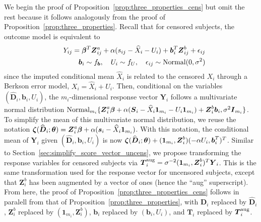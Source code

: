 \documentclass[12pt]{article}
\def\Normal{\hbox{Normal}}
\def\bse{\begin{eqnarray*}}
\def\ese{\end{eqnarray*}}
\def\bse{\begin{eqnarray*}}
\def\ese{\end{eqnarray*}}
\def\bS{{\mathbf S}}
\def\bzero{{\mathbf 0}}
\newcommand{\bzeta}{\mbox{\boldmath $\zeta$}}
\def\bbeta{{\boldsymbol{\beta}}}
\def\btheta{{\boldsymbol{\theta}}}
\def\bzero{{\boldsymbol{0}}}
\def\bone{{\boldsymbol{1}}}
\def\bb{{\boldsymbol b}}
\def\bs{{\boldsymbol s}}
\def\bA{{\boldsymbol A}}
\def\bD{{\boldsymbol D}}
\def\bI{{\boldsymbol I}}
\def\bS{{\boldsymbol S}}
\def\bT{{\boldsymbol T}}
\def\bY{{\boldsymbol Y}}
\def\bZ{{\boldsymbol Z}}
\def\tilD{\bD}
\begin{document}
We begin the proof of Proposition~\ref{prop:three_properties_cens} but omit the rest because it follows analogously from the proof of Proposition~\ref{prop:three_properties}. Recall that for censored subjects, the outcome model is equivalent to
\bse
&&Y_{ij} =
\bbeta^T \bZ^a_{ij} + \alpha(s_{ij} - \widehat{X}_i - U_i) + \bb_i^T \bZ^b_{ij} + \epsilon_{ij}\\
&&\bb_i\sim f_{\bb}, \ \ \ U_i\sim f_U, \ \ \  \epsilon_{ij}\sim\Normal(0,\sigma^2)
\ese
since the imputed conditional mean $\widehat{X}_i$ is related to the censored $X_i$ through a Berkson error model, $X_i = \widehat{X}_i + U_i$. Then, conditional on the variables $(\widehat{\tilD}_i, \bb_i,U_i)$, the $m_i$-dimensional response vector $\bY_{i}$ follows a multivariate normal distribution $\Normal_{m_i}\{\bZ^a_i\bbeta  + \alpha(\bS_i - \widehat{X}_i\bone_{m_i} - U_i\bone_{m_i}) + \bZ^b_i\bb_i, \sigma^2\bI_{m_i}\}$. To simplify the mean of this multivariate normal distribution, we reuse the notation $\bzeta(\widehat{\tilD}_i;\btheta)=\bZ^a_i\bbeta+\alpha(\bs_i - \widehat{X}_i\bone_{m_i})$. With this notation, the conditional mean of $\bY_i$ given $(\widehat{\tilD}_i, \bb_i,U_i)$ is now $\bzeta(\widehat{\tilD}_i;\btheta)+(\bone_{m_i},\bZ^b_i)(-\alpha U_i, \bb_i^T)^T$.
Similar to Section~\ref{sec:simplify_score_vector_uncens}, we propose transforming the response variables for censored subjects via $\bT_i^{\rm aug}=\sigma^{-2}(\bone_{m_i},\bZ^b_i)^T\bY_i$. This is the same transformation used for the response vector for uncensored subjects, except that $\bZ_i^b$ has been augmented by a vector of ones (hence the ``aug'' superscript). From here, the proof of Proposition~\ref{prop:three_properties_cens} follows in paralell from that of Proposition~\ref{prop:three_properties}, with $\tilD_i$ replaced by $\widehat{\tilD}_i$, $\bZ_i^b$ replaced by $(\bone_{m_i},\bZ^b_i)$, $\bb_i$ replaced by $(\bb_i, U_i)$, and $\bT_i$ replaced by $\bT^{\rm aug}_i$.
\end{document}
